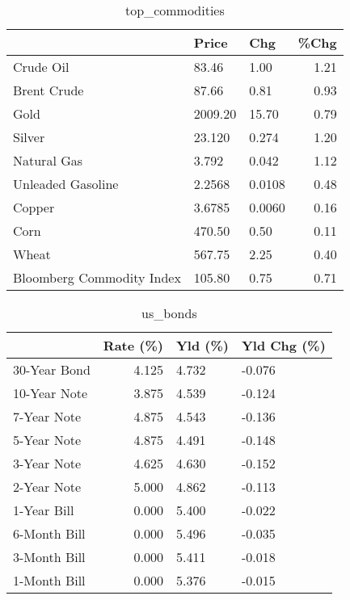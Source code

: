 \documentclass{article}%
\begin{document}
\begin{table}[htbp]%
\caption{top\_commodities}%
\centering%
\begin{adjustbox}{width=1\textwidth}%
\begin{tabular}{lllr}
\toprule
                          &   Price &    Chg &  \%Chg \\
\midrule
               Crude Oil  &   83.46 &   1.00 &  1.21 \\
             Brent Crude  &   87.66 &   0.81 &  0.93 \\
                    Gold  & 2009.20 &  15.70 &  0.79 \\
                  Silver  &  23.120 &  0.274 &  1.20 \\
             Natural Gas  &   3.792 &  0.042 &  1.12 \\
       Unleaded Gasoline  &  2.2568 & 0.0108 &  0.48 \\
                  Copper  &  3.6785 & 0.0060 &  0.16 \\
                    Corn  &  470.50 &   0.50 &  0.11 \\
                   Wheat  &  567.75 &   2.25 &  0.40 \\
Bloomberg Commodity Index &  105.80 &   0.75 &  0.71 \\
\bottomrule
\end{tabular}
%
\end{adjustbox}%
\end{table}

%


\begin{table}[htbp]%
\caption{us\_bonds}%
\centering%
\begin{adjustbox}{width=1\textwidth}%
\begin{tabular}{lrll}
\toprule
             &  Rate (\%) & Yld (\%) & Yld Chg (\%) \\
\midrule
30-Year Bond &     4.125 &   4.732 &      -0.076 \\
10-Year Note &     3.875 &   4.539 &      -0.124 \\
 7-Year Note &     4.875 &   4.543 &      -0.136 \\
 5-Year Note &     4.875 &   4.491 &      -0.148 \\
 3-Year Note &     4.625 &   4.630 &      -0.152 \\
 2-Year Note &     5.000 &   4.862 &      -0.113 \\
 1-Year Bill &     0.000 &   5.400 &      -0.022 \\
6-Month Bill &     0.000 &   5.496 &      -0.035 \\
3-Month Bill &     0.000 &   5.411 &      -0.018 \\
1-Month Bill &     0.000 &   5.376 &      -0.015 \\
\bottomrule
\end{tabular}
%
\end{adjustbox}%
\end{table}
\end{document}
